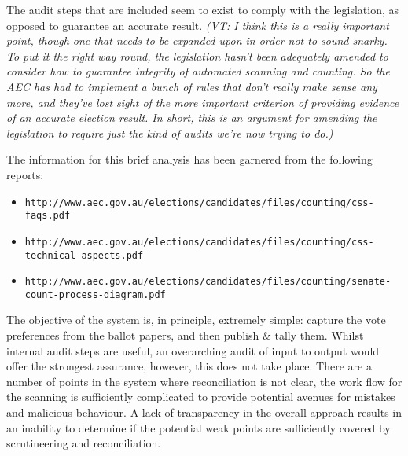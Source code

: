 \documentclass[10pt,a4paper]{article}
\newcommand{\VTNote}[1]{{\it(VT: #1)}}
\begin{document}
The audit steps that are included seem to exist to comply with the legislation, as opposed to guarantee an accurate result.  \VTNote{I think this is a really important point, though one that needs to be expanded upon in order not to sound snarky.  To put it the right way round, the legislation hasn't been adequately amended to consider how to guarantee integrity of automated scanning and counting.  So the AEC has had to implement a bunch of rules that don't really make sense any more, and they've lost sight of the more important criterion of providing evidence of an accurate election result.  In short, this is an argument for amending the legislation to require just the kind of audits we're now trying to do.}

The information for this brief analysis has been garnered from the following reports:
\begin{itemize}
\item {\tt	http://www.aec.gov.au/elections/candidates/files/counting/css-faqs.pdf}
\item {\tt	http://www.aec.gov.au/elections/candidates/files/counting/css-technical-aspects.pdf}
\item {\tt	http://www.aec.gov.au/elections/candidates/files/counting/senate-count-process-diagram.pdf}
\end{itemize}

The objective of the system is, in principle, extremely simple: capture the vote preferences from the ballot papers, and then publish \& tally them. Whilst internal audit steps are useful, an overarching audit of input to output would offer the strongest assurance, however, this does not take place. There are a number of points in the system where reconciliation is not clear, the work flow for the scanning is sufficiently complicated to provide potential avenues for mistakes and malicious behaviour. A lack of transparency in the overall approach results in an inability to determine if the potential weak points are sufficiently covered by scrutineering and reconciliation. 
\end{document}
